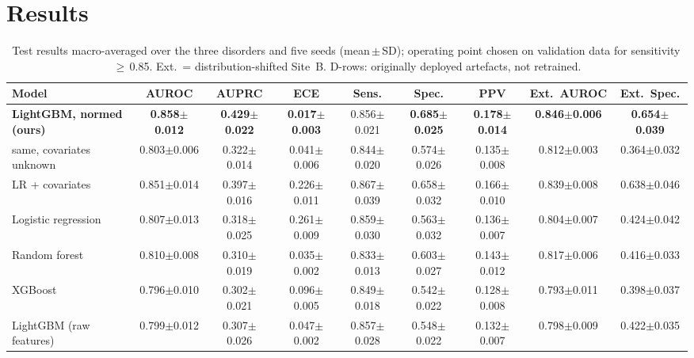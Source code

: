 \documentclass[conference]{IEEEtran}
\newcommand{\pmsd}[2]{#1{\scriptsize$\pm$#2}}
\begin{document}
\section{Results}\label{sec:results}
\begin{table}[!t]
\centering
\caption{Test results macro-averaged over the three disorders and five seeds (mean\,$\pm$\,SD); operating point chosen on validation data for sensitivity\,$\geq$\,0.85. Ext.\ = distribution-shifted Site~B. D-rows: originally deployed artefacts, not retrained.}
\label{tab:main}
\footnotesize
\setlength{\tabcolsep}{3.6pt}
\begin{tabular}{lcccccccc}
\toprule
Model & AUROC & AUPRC & ECE & Sens. & Spec. & PPV & Ext.\ AUROC & Ext.\ Spec. \\
\midrule
\textbf{LightGBM, normed (ours)} & \textbf{\pmsd{0.858}{0.012}} & \textbf{\pmsd{0.429}{0.022}} & \textbf{\pmsd{0.017}{0.003}} & \pmsd{0.856}{0.021} & \textbf{\pmsd{0.685}{0.025}} & \textbf{\pmsd{0.178}{0.014}} & \textbf{\pmsd{0.846}{0.006}} & \textbf{\pmsd{0.654}{0.039}} \\
\quad same, covariates unknown & \pmsd{0.803}{0.006} & \pmsd{0.322}{0.014} & \pmsd{0.041}{0.006} & \pmsd{0.844}{0.020} & \pmsd{0.574}{0.026} & \pmsd{0.135}{0.008} & \pmsd{0.812}{0.003} & \pmsd{0.364}{0.032} \\
LR + covariates & \pmsd{0.851}{0.014} & \pmsd{0.397}{0.016} & \pmsd{0.226}{0.011} & \pmsd{0.867}{0.039} & \pmsd{0.658}{0.032} & \pmsd{0.166}{0.010} & \pmsd{0.839}{0.008} & \pmsd{0.638}{0.046} \\
Logistic regression & \pmsd{0.807}{0.013} & \pmsd{0.318}{0.025} & \pmsd{0.261}{0.009} & \pmsd{0.859}{0.030} & \pmsd{0.563}{0.032} & \pmsd{0.136}{0.007} & \pmsd{0.804}{0.007} & \pmsd{0.424}{0.042} \\
Random forest & \pmsd{0.810}{0.008} & \pmsd{0.310}{0.019} & \pmsd{0.035}{0.002} & \pmsd{0.833}{0.013} & \pmsd{0.603}{0.027} & \pmsd{0.143}{0.012} & \pmsd{0.817}{0.006} & \pmsd{0.416}{0.033} \\
XGBoost & \pmsd{0.796}{0.010} & \pmsd{0.302}{0.021} & \pmsd{0.096}{0.005} & \pmsd{0.849}{0.018} & \pmsd{0.542}{0.022} & \pmsd{0.128}{0.008} & \pmsd{0.793}{0.011} & \pmsd{0.398}{0.037} \\
LightGBM (raw features) & \pmsd{0.799}{0.012} & \pmsd{0.307}{0.026} & \pmsd{0.047}{0.002} & \pmsd{0.857}{0.028} & \pmsd{0.548}{0.022} & \pmsd{0.132}{0.007} & \pmsd{0.798}{0.009} & \pmsd{0.422}{0.035} \\

\end{tabular}
\end{table}
\end{document}
